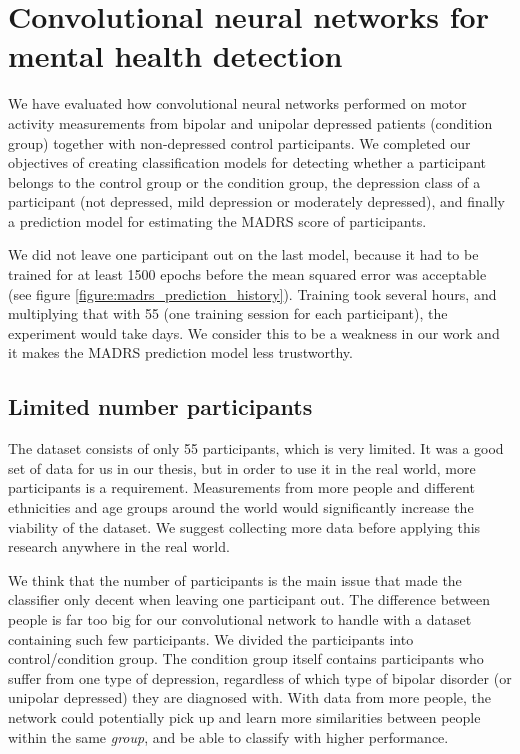 \section{Convolutional neural networks for mental health detection}
We have evaluated how convolutional neural networks performed on motor activity measurements from bipolar and unipolar depressed patients (condition group) together with non-depressed control participants. We completed our objectives of creating classification models for detecting whether a participant belongs to the control group or the condition group, the depression class of a participant (not depressed, mild depression or moderately depressed), and finally a prediction model for estimating the MADRS score of participants. 

We did not leave one participant out on the last model, because it had to be trained for at least 1500 epochs before the mean squared error was acceptable (see figure \ref{figure:madrs_prediction_history}). Training took several hours, and multiplying that with 55 (one training session for each participant), the experiment would take days. We consider this to be a weakness in our work and it makes the MADRS prediction model less trustworthy. 

\subsection{Limited number participants}
The dataset consists of only 55 participants, which is very limited. It was a good set of data for us in our thesis, but in order to use it in the real world, more participants is a requirement. Measurements from more people and different ethnicities and age groups around the world would significantly increase the viability of the dataset. We suggest collecting more data before applying this research anywhere in the real world.
 
We think that the number of participants is the main issue that made the classifier only decent when leaving one participant out. The difference between people is far too big for our convolutional network to handle with a dataset containing such few participants. We divided the participants into control/condition group. The condition group itself contains participants who suffer from one type of depression, regardless of which type of bipolar disorder (or unipolar depressed) they are diagnosed with. With data from more people, the network could potentially pick up and learn more similarities between people within the same \textit{group}, and be able to classify with higher performance. 

